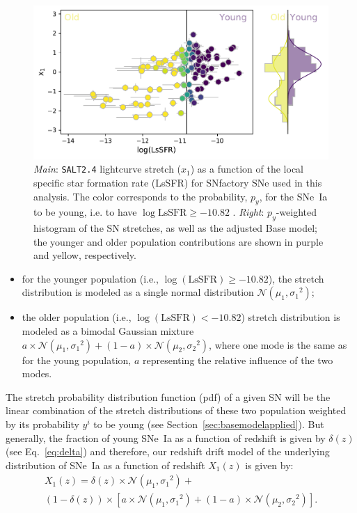 \documentclass[]{aa} %
\begin{document}
\begin{figure}
    \centering
    \includegraphics[width=0.8\linewidth]{Article_figures/model_base_hist.pdf}
    \caption{\textit{Main}: \textsc{\texttt{SALT2.4}} lightcurve stretch ($x_1$)
        as a function of the local specific star formation rate (LsSFR) for
        SNfactory SNe used in this analysis. The color corresponds to the
        probability, $p_y$, for the SNe~Ia to be young, i.e. to have
        $\log\mathrm{LsSFR} \geq -10.82$ \citep[see][]{rigault2018}.
        \textit{Right}: $p_y$-weighted histogram of the SN stretches, as well as
        the adjusted Base model; the younger and older population contributions
        are shown in purple and yellow, respectively.}
    \label{fig:stretchlssfr}
\end{figure}

\begin{itemize}
    \item for the younger population (i.e., $\log(\mathrm{LsSFR})\geq-10.82$),
        the stretch distribution is modeled as a single normal distribution
        $\mathcal{N}(\mu_1, \sigma_1{}^2)$; 
    \item the older population (i.e., $\log( \mathrm{LsSFR})<-10.82$) stretch
        distribution is modeled as a bimodal Gaussian mixture $a\times
        \mathcal{N}(\mu_1, \sigma_1{}^2) + (1-a)\times \mathcal{N}(\mu_2,
        \sigma_2{}^2)$, where one mode is the same as for the young population,
        $a$ representing the relative influence of the two modes.
\end{itemize}

The stretch probability distribution function (pdf) of a given SN will be the
linear combination of the stretch distributions of these two population weighted
by its probability $y^i$ to be young (see Section~\ref{sec:basemodelapplied}).
But generally, the fraction of young SNe~Ia as a function of redshift is given
by $\delta(z)$ (see Eq.~\ref{eq:delta}) and therefore, our redshift drift model
of the underlying distribution of SNe~Ia as a function of redshift $X_1(z)$ is
given by:
\begin{multline}\label{eq:stretchz}
    X_1(z) = \delta(z) \times \mathcal{N}(\mu_1,\sigma_1{}^2) + {} \\
    (1-\delta(z)) \times \left[ a\times\mathcal{N}(\mu_1,\sigma_1{}^2) +
    (1-a)\times\mathcal{N}(\mu_2,\sigma_2{}^2) \right].
\end{multline}
\end{document}
